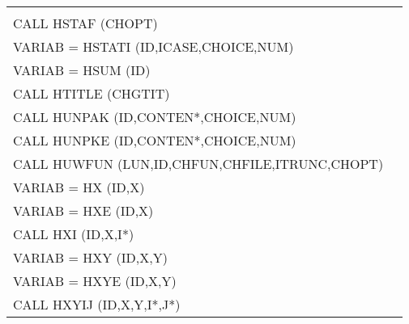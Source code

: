 \begin{longtable}{|>{\ttfamily\small}p{.9\linewidth}r|}
&                                                       \pageref{HSQUEZ} \\
CALL     HSTAF  (CHOPT)                 
&                                                       \pageref{HSTAF}  \\
VARIAB = HSTATI (ID,ICASE,CHOICE,NUM)        
&                                                       \pageref{HSTATI} \\
VARIAB = HSUM   (ID)                         
&                                                       \pageref{HSUM}   \\
CALL     HTITLE (CHGTIT)                     
&                                                       \pageref{HTITLE} \\
CALL     HUNPAK (ID,CONTEN*,CHOICE,NUM)      
&                                                       \pageref{HUNPAK} \\
CALL     HUNPKE (ID,CONTEN*,CHOICE,NUM)      
&                                                       \pageref{HUNPKE} \\
CALL     HUWFUN (LUN,ID,CHFUN,CHFILE,ITRUNC,CHOPT)
&                                                       \pageref{HUWFUN} \\
VARIAB = HX    (ID,X)                        
&                                                       \pageref{HX}     \\
VARIAB = HXE    (ID,X)                       
&                                                       \pageref{HXE}    \\
CALL     HXI    (ID,X,I*)                    
&                                                       \pageref{HXI}    \\
VARIAB = HXY    (ID,X,Y)                     
&                                                       \pageref{HXY}    \\
VARIAB = HXYE   (ID,X,Y)                     
&                                                       \pageref{HXYE}   \\
CALL     HXYIJ  (ID,X,Y,I*,J*)               
&                                                       \pageref{HXYIJ}  \\
\end{longtable}

\endinput


